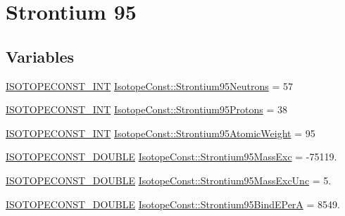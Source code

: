 \hypertarget{group___isotope_const-_strontium-_sr95}{}\section{Strontium 95}
\label{group___isotope_const-_strontium-_sr95}
\subsection*{Variables}
\begin{DoxyCompactItemize}
\item 
\mbox{\hyperlink{group___isotope_const-_macros_ga5f18360b3e99483a35c32d789e62621c}{I\+S\+O\+T\+O\+P\+E\+C\+O\+N\+S\+T\+\_\+\+I\+NT}} \mbox{\hyperlink{group___isotope_const-_strontium-_sr95_ga0de5bf14cceac5508b496b2c9f17cbac}{Isotope\+Const\+::\+Strontium95\+Neutrons}} = 57
\item 
\mbox{\hyperlink{group___isotope_const-_macros_ga5f18360b3e99483a35c32d789e62621c}{I\+S\+O\+T\+O\+P\+E\+C\+O\+N\+S\+T\+\_\+\+I\+NT}} \mbox{\hyperlink{group___isotope_const-_strontium-_sr95_ga322a5c15ffe065a1cc477b8da9c54b05}{Isotope\+Const\+::\+Strontium95\+Protons}} = 38
\item 
\mbox{\hyperlink{group___isotope_const-_macros_ga5f18360b3e99483a35c32d789e62621c}{I\+S\+O\+T\+O\+P\+E\+C\+O\+N\+S\+T\+\_\+\+I\+NT}} \mbox{\hyperlink{group___isotope_const-_strontium-_sr95_ga337d7ecb8f588ab12b146ee0cf41ff00}{Isotope\+Const\+::\+Strontium95\+Atomic\+Weight}} = 95
\item 
\mbox{\hyperlink{group___isotope_const-_macros_ga8f45a7272ce02c0b4c65c44636ed719a}{I\+S\+O\+T\+O\+P\+E\+C\+O\+N\+S\+T\+\_\+\+D\+O\+U\+B\+LE}} \mbox{\hyperlink{group___isotope_const-_strontium-_sr95_ga5cdc8de9109689d909d8e271396a0b07}{Isotope\+Const\+::\+Strontium95\+Mass\+Exc}} = -\/75119.
\item 
\mbox{\hyperlink{group___isotope_const-_macros_ga8f45a7272ce02c0b4c65c44636ed719a}{I\+S\+O\+T\+O\+P\+E\+C\+O\+N\+S\+T\+\_\+\+D\+O\+U\+B\+LE}} \mbox{\hyperlink{group___isotope_const-_strontium-_sr95_gad021eea25d541de9ef63242519f27508}{Isotope\+Const\+::\+Strontium95\+Mass\+Exc\+Unc}} = 5.
\item 
\mbox{\hyperlink{group___isotope_const-_macros_ga8f45a7272ce02c0b4c65c44636ed719a}{I\+S\+O\+T\+O\+P\+E\+C\+O\+N\+S\+T\+\_\+\+D\+O\+U\+B\+LE}} \mbox{\hyperlink{group___isotope_const-_strontium-_sr95_gaa3d3491355afa30d83cda003af8f918e}{Isotope\+Const\+::\+Strontium95\+Bind\+E\+PerA}} = 8549.
\item 

\end{DoxyCompactItemize}

